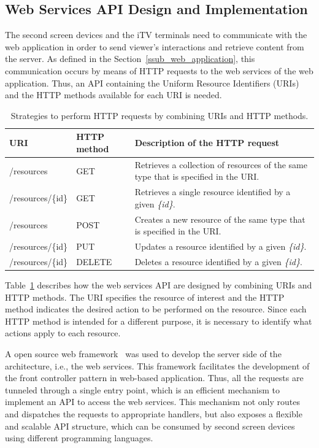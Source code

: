 \documentclass[journal]{IEEEtran}
\begin{document}
\subsection{Web Services API Design and Implementation}

The second screen devices and the iTV terminals need to communicate with the web application in order to send viewer's interactions and retrieve content from the server. As defined in the Section~\ref{ssub_web_application}, this communication occurs by means of HTTP requests to the web services of the web application. Thus, an API containing the Uniform Resource Identifiers (URIs) and the HTTP methods available for each URI is needed.

\begin{table}
	\caption{Strategies to perform HTTP requests by combining URIs and HTTP methods.}
	\label{table_web_serv_design}
	\centering
	\begin{tabular}{|m{1.5cm}|>{\centering}m{1cm}|m{5cm}|}
	\hline
	\textbf{URI}&\textbf{HTTP method}&\textbf{Description of the HTTP request}\tabularnewline
	\hline
	/resources & GET & Retrieves a collection of resources of the same type that is specified in the URI. \tabularnewline
	\hline
	/resources/\{id\} & GET & Retrieves a single resource identified by a given \emph{\{id\}}.\tabularnewline
	\hline
	/resources & POST & Creates a new resource of the same type that is specified in the URI.\tabularnewline
	\hline
	/resources/\{id\} & PUT & Updates a resource identified by a given \emph{\{id\}}.\tabularnewline
	\hline
	/resources/\{id\} & DELETE & Deletes a resource identified by a given \emph{\{id\}}.
	\tabularnewline
	\hline
	\end{tabular}
\end{table}

Table~\ref{table_web_serv_design} describes how the web services API are designed by combining URIs and HTTP methods. The URI specifies the resource of interest and the HTTP method indicates the desired action to be performed on the resource. Since each HTTP method is intended for a different purpose, it is necessary to identify what actions apply to each resource.

A open source web framework~\cite{Wheeler2013} was used to develop the server side of the architecture, i.e., the web services. This framework facilitates the development of the front controller pattern in web-based application. Thus, all the requests are tunneled through a single entry point, which is an efficient mechanism to implement an API to access the web services. This mechanism not only routes and dispatches the requests to appropriate handlers, but also exposes a flexible and scalable API structure, which can be consumed by second screen devices using different programming languages.
\end{document}
